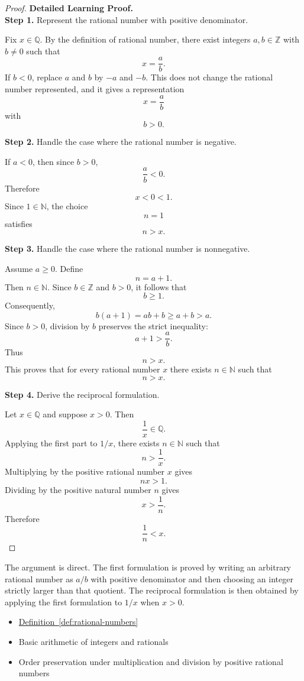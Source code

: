 \begin{proof}
\textbf{Detailed Learning Proof.}~\\

\textbf{Step 1.} Represent the rational number with positive denominator.

Fix $x\in\mathbb{Q}$. By the definition of rational number, there exist
integers $a,b\in\mathbb{Z}$ with $b\neq 0$ such that
\[
x=\frac{a}{b}.
\]
If $b<0$, replace $a$ and $b$ by $-a$ and $-b$. This does not change
the rational number represented, and it gives a representation
\[
x=\frac{a}{b}
\]
with
\[
b>0.
\]

\textbf{Step 2.} Handle the case where the rational number is negative.

If $a<0$, then since $b>0$,
\[
\frac{a}{b}<0.
\]
Therefore
\[
x<0<1.
\]
Since $1\in\mathbb{N}$, the choice
\[
n=1
\]
satisfies
\[
n>x.
\]

\textbf{Step 3.} Handle the case where the rational number is nonnegative.

Assume $a\ge 0$. Define
\[
n=a+1.
\]
Then $n\in\mathbb{N}$. Since $b\in\mathbb{Z}$ and $b>0$, it follows
that
\[
b\ge 1.
\]
Consequently,
\[
b(a+1)=ab+b\ge a+b>a.
\]
Since $b>0$, division by $b$ preserves the strict inequality:
\[
a+1>\frac{a}{b}.
\]
Thus
\[
n>x.
\]
This proves that for every rational number $x$ there exists
$n\in\mathbb{N}$ such that
\[
n>x.
\]

\textbf{Step 4.} Derive the reciprocal formulation.

Let $x\in\mathbb{Q}$ and suppose $x>0$. Then
\[
\frac{1}{x}\in\mathbb{Q}.
\]
Applying the first part to $1/x$, there exists $n\in\mathbb{N}$ such
that
\[
n>\frac{1}{x}.
\]
Multiplying by the positive rational number $x$ gives
\[
nx>1.
\]
Dividing by the positive natural number $n$ gives
\[
x>\frac{1}{n}.
\]
Therefore
\[
\frac{1}{n}<x.
\]
\end{proof}

\begin{remark*}
The argument is direct. The first formulation is proved by writing an
arbitrary rational number as $a/b$ with positive denominator and then
choosing an integer strictly larger than that quotient. The reciprocal
formulation is then obtained by applying the first formulation to $1/x$
when $x>0$.
\end{remark*}

\begin{dependencies}
\begin{itemize}
  \item \hyperref[def:rational-numbers]{Definition~\ref*{def:rational-numbers}}
  \item Basic arithmetic of integers and rationals
  \item Order preservation under multiplication and division by positive rational numbers
\end{itemize}
\end{dependencies}
